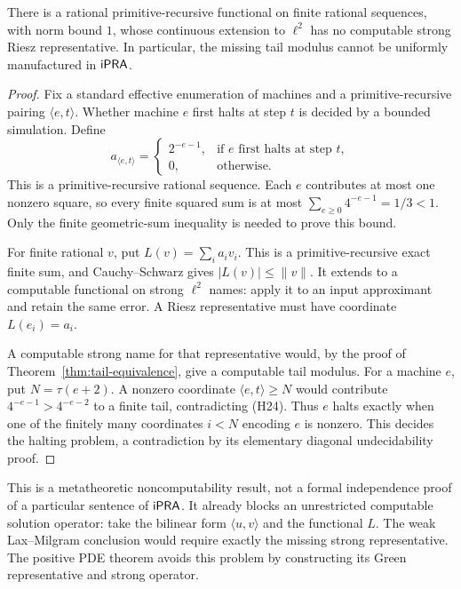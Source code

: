 \begin{proposition}
\label{prop:riesz-obstruction}
There is a rational primitive-recursive functional on finite rational
sequences, with norm bound \(1\), whose continuous extension to
\(\ell^2\) has no computable strong Riesz representative. In particular,
the missing tail modulus cannot be uniformly manufactured in \(\mathsf{iPRA}\).
\end{proposition}
\begin{proof}
Fix a standard effective enumeration of machines and a primitive-recursive
pairing \(\langle e,t\rangle\). Whether machine \(e\) first halts at step
\(t\) is decided by a bounded simulation. Define
\[
 a_{\langle e,t\rangle}=
 \begin{cases}
 2^{-e-1},&\text{if \(e\) first halts at step \(t\)},\\
 0,&\text{otherwise.}
 \end{cases}
\tag{H25}
\]
This is a primitive-recursive rational sequence. Each \(e\) contributes
at most one nonzero square, so every finite squared sum is at most
\(\sum_{e\geq0}4^{-e-1}=1/3<1\). Only the finite geometric-sum inequality
is needed to prove this bound.

For finite rational \(v\), put \(L(v)=\sum_i a_i v_i\).
This is a primitive-recursive exact finite sum, and Cauchy--Schwarz gives
\(|L(v)|\leq\|v\|\). It extends to a computable functional on strong
\(\ell^2\) names: apply it to an input approximant and retain the same error.
A Riesz representative must have coordinate \(L(e_i)=a_i\).

A computable strong name for that representative would, by the proof of
Theorem~\ref{thm:tail-equivalence}, give a computable tail modulus.
For a machine \(e\), put \(N=\tau(e+2)\). A nonzero coordinate
\(\langle e,t\rangle\geq N\) would contribute
\(4^{-e-1}>4^{-e-2}\) to a finite tail, contradicting (H24).
Thus \(e\) halts exactly when one of the finitely many coordinates \(i<N\)
encoding \(e\) is nonzero. This decides the halting problem, a contradiction
by its elementary diagonal undecidability proof.
\end{proof}

This is a metatheoretic noncomputability result, not a formal independence
proof of a particular sentence of \(\mathsf{iPRA}\).
It already blocks an unrestricted computable solution operator: take the
bilinear form \(\langle u,v\rangle\) and the functional \(L\). The weak
Lax--Milgram conclusion would require exactly the missing strong
representative. The positive PDE theorem avoids this problem by constructing
its Green representative and strong operator.

